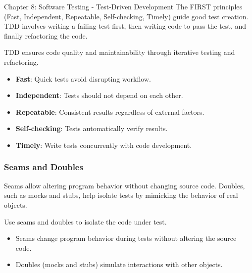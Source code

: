 \begin{notes}{Chapter 8: Software Testing - Test-Driven Development}
    The FIRST principles (Fast, Independent, Repeatable, Self-checking, Timely) guide good test creation. TDD involves writing a failing test first, then writing code to pass the test, and finally refactoring the code.
    
    \begin{highlight}
    
        TDD ensures code quality and maintainability through iterative testing and refactoring.
        
        \begin{itemize}
            \item \textbf{Fast}: Quick tests avoid disrupting workflow.
            \item \textbf{Independent}: Tests should not depend on each other.
            \item \textbf{Repeatable}: Consistent results regardless of external factors.
            \item \textbf{Self-checking}: Tests automatically verify results.
            \item \textbf{Timely}: Write tests concurrently with code development.
        \end{itemize}
    
    \end{highlight}
    
    \subsubsection*{Seams and Doubles}
    
    Seams allow altering program behavior without changing source code. Doubles, such as mocks and stubs, help isolate tests by mimicking the behavior of real objects.
    
    \begin{highlight}
    
        Use seams and doubles to isolate the code under test.
        
        \begin{itemize}
            \item Seams change program behavior during tests without altering the source code.
            \item Doubles (mocks and stubs) simulate interactions with other objects.
        \end{itemize}
    
    \end{highlight}
    

\end{notes}
